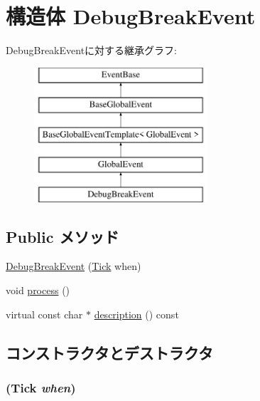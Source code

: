 \hypertarget{structDebugBreakEvent}{
\section{構造体 DebugBreakEvent}
\label{structDebugBreakEvent}
}
DebugBreakEventに対する継承グラフ:\begin{figure}[H]
\begin{center}
\leavevmode
\includegraphics[height=5cm]{structDebugBreakEvent}
\end{center}
\end{figure}
\subsection*{Public メソッド}
\begin{DoxyCompactItemize}
\item 
\hyperlink{structDebugBreakEvent_a4668f782011b6330c6bcfbe8c770d498}{DebugBreakEvent} (\hyperlink{base_2types_8hh_a5c8ed81b7d238c9083e1037ba6d61643}{Tick} when)
\item 
void \hyperlink{structDebugBreakEvent_a2e9c5136d19b1a95fc427e0852deab5c}{process} ()
\item 
virtual const char $\ast$ \hyperlink{structDebugBreakEvent_a5a14fe478e2393ff51f02e9b7be27e00}{description} () const 
\end{DoxyCompactItemize}


\subsection{コンストラクタとデストラクタ}
\hypertarget{structDebugBreakEvent_a4668f782011b6330c6bcfbe8c770d498}{
\subsubsection[{DebugBreakEvent}]{ ({\bf Tick} {\em when})}}
\label{structDebugBreakEvent_a4668f782011b6330c6bcfbe8c770d498}




